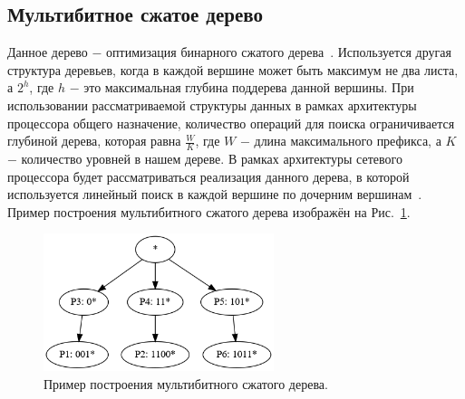 \documentclass[a4paper, 12pt, titlepage, finall]{extreport}
\begin{document}
        \subsection{Мультибитное сжатое дерево}
            Данное дерево $-$ оптимизация бинарного сжатого дерева~\cite{berger2003ip}.
            Используется другая структура деревьев, когда в каждой вершине может быть максимум не два листа, 
            а {\ttfamily $2^h$}, где {\ttfamily $h$} $-$ это максимальная глубина поддерева данной вершины.
            При использовании рассматриваемой структуры данных в рамках архитектуры процессора общего назначение, количество операций для поиска ограничивается глубиной дерева,
            которая равна {\ttfamily $\frac{W}{K}$}, где {\ttfamily $W$} $-$ длина максимального префикса, а {\ttfamily $K$} $-$ количество уровней в нашем дереве.
            В рамках архитектуры сетевого процессора будет рассматриваться реализация данного дерева, в которой используется линейный поиск в каждой вершине по дочерним вершинам~\cite{berger2003ip}.
            Пример построения мультибитного сжатого дерева изображён на Рис.~\ref{fig:mesh3}.
            \begin{figure}[h]
                \centering
                \includegraphics[width=0.6\textwidth]{multybit_compressed.png}
                \caption{Пример построения мультибитного сжатого дерева.}\label{fig:mesh3}
            \end{figure}
\end{document}
